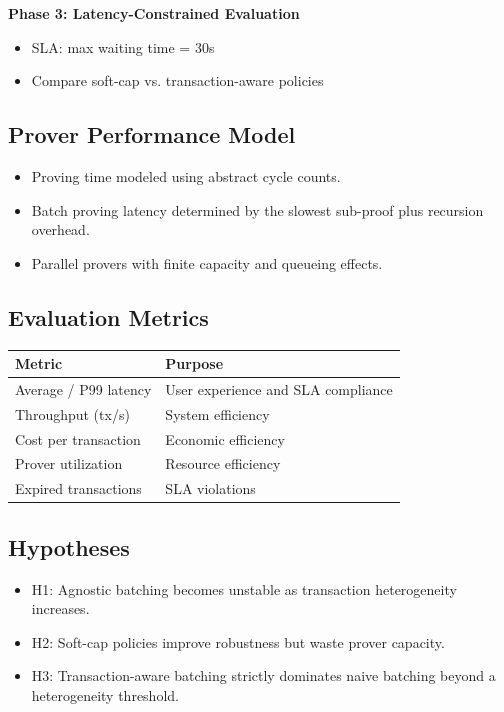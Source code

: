 \textbf{Phase 3: Latency-Constrained Evaluation}
\begin{itemize}
    \item SLA: max waiting time = 30s
    \item Compare soft-cap vs. transaction-aware policies
\end{itemize}

\subsection{Prover Performance Model}

\begin{itemize}[leftmargin=1.5em]
    \item Proving time modeled using abstract cycle counts.
    \item Batch proving latency determined by the slowest sub-proof plus recursion overhead.
    \item Parallel provers with finite capacity and queueing effects.
\end{itemize}

\subsection{Evaluation Metrics}

\begin{center}
\begin{tabular}{ll}
\toprule
\textbf{Metric} & \textbf{Purpose} \\
\midrule
Average / P99 latency & User experience and SLA compliance \\
Throughput (tx/s) & System efficiency \\
Cost per transaction & Economic efficiency \\
Prover utilization & Resource efficiency \\
Expired transactions & SLA violations \\
\bottomrule
\end{tabular}
\end{center}

\subsection{Hypotheses}

\begin{itemize}[leftmargin=1.5em]
    \item H1: Agnostic batching becomes unstable as transaction heterogeneity increases.
    \item H2: Soft-cap policies improve robustness but waste prover capacity.
    \item H3: Transaction-aware batching strictly dominates naive batching beyond a heterogeneity threshold.
\end{itemize}

